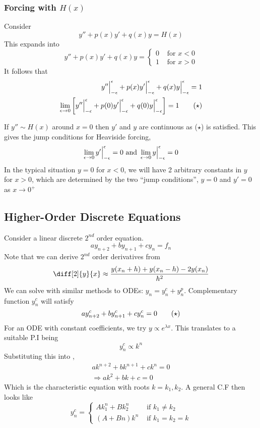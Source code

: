 \documentclass{article}
\begin{document}
\subsubsection{Forcing with $H(x)$}
Consider
\[
    y'' + p(x)y' + q(x)y = H(x)  
\]
This expands into
\[
    y'' + p(x)y' + q(x)y = \begin{cases}
        0 & \text{ for } x < 0 \\
        1 & \text{ for } x > 0
    \end{cases}
\]
It follows that
\begin{align*}
    y'' \Big{|}_{-\epsilon}^{\epsilon} + p(x)y' \Big{|}_{-\epsilon}^{\epsilon} + q(x)y \Big{|}_{-\epsilon}^{\epsilon} = 1 \\
    \lim_{\epsilon \rightarrow 0} \left[ y'' \Big{|}_{-\epsilon}^{\epsilon} + p(0)y' \Big{|}_{-\epsilon}^{\epsilon} + q(0)y \Big{|}_{-\epsilon}^{\epsilon} \right] = 1 \tag{$\star$}
\end{align*}

If $y'' \sim H(x)$ around $x = 0$ then $y'$ and $y$ are continuous as ($\star$) is satisfied.
This gives the jump conditions for Heaviside forcing,
\[
    \lim_{\epsilon \rightarrow 0} y' \Big{|}_{-\epsilon}^{\epsilon} = 0 \text{ and } \lim_{\epsilon \rightarrow 0} y \Big{|}_{-\epsilon}^{\epsilon} = 0
\]
In the typical situation $y = 0$ for $x < 0$, we will have 2 arbitrary constants in $y$ for $x > 0$, which are determined by the two ``jump conditions'',
$y = 0$ and $y' = 0$ as $x \rightarrow 0^+$

\subsection{Higher-Order Discrete Equations}
Consider a linear discrete $2^{nd}$ order equation.
\[
    a y_{n+2} + b y_{n+1} + c y_n = f_n  
\]
Note that we can derive $2^{nd}$ order derivatives from
\[
    \diff[2]{y}{x} \approx \frac{y(x_n + h) + y(x_n - h) - 2y(x_n)}{h^2}
\]
We can solve with similar methods to ODEs: $y_n = y^{c}_n + y^p_n$.
Complementary function $y^c_n$ will satisfy
\[
    a y^c_{n+2} + b y^c_{n+1} + c y^c_n = 0 \tagstar
\]
For an ODE with constant coefficients, we try $y \propto e^{\lambda x}$.
This translates to a suitable P.I being
\[
    y^c_n \propto k^n
\]
Substituting this into ,
\begin{align*}
    a k^{n+2} + b k^{n+1} + c k^n = 0 \\
    \Rightarrow a k^2 + bk + c = 0
\end{align*}
Which is the characteristic equation with roots $k = k_1, k_2$.
A general C.F then looks like
\[
    y^c_n = \begin{cases}
        A k_1^n + B k_2^n & \text{ if } k_1 \neq k_2 \\
        (A + Bn) k^n & \text{ if } k_1 = k_2 = k
    \end{cases}
\]
\end{document}
